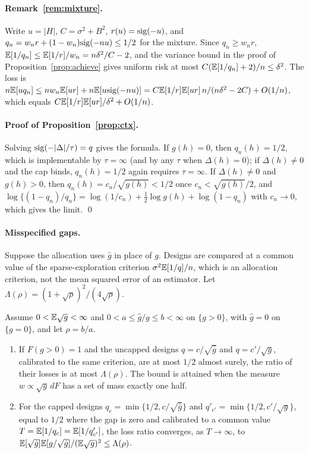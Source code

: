 \paragraph{Remark~\ref{rem:mixture}.} Write $u=|H|$, $C=\sigma^2+B^2$,
$r(u)=\mathrm{sig}(-u)$, and $q_n=w_nr+(1-w_n)\mathrm{sig}(-nu)\le1/2$ for the mixture. Since
$q_n\ge w_nr$, $\mathbb{E}[1/q_n]\le\mathbb{E}[1/r]/w_n=n\delta^2/C-2$, and the variance bound in
the proof of Proposition~\ref{prop:achieve} gives uniform risk at most
$C(\mathbb{E}[1/q_n]+2)/n\le\delta^2$. The loss is
$n\mathbb{E}[uq_n]\le nw_n\mathbb{E}[ur]+n\mathbb{E}[u\mathrm{sig}(-nu)]=C\mathbb{E}[1/r]\mathbb{E}[ur]\,n/(n\delta^2-2C)+O(1/n)$,
which equals $C\mathbb{E}[1/r]\mathbb{E}[ur]/\delta^2+O(1/n)$.

\paragraph{Proof of Proposition~\ref{prop:ctx}.} Solving
$\mathrm{sig}(-|\Delta|/\tau)=q$ gives the formula. If $g(h)=0$, then $q_n(h)=1/2$, which
is implementable by $\tau=\infty$ (and by any $\tau$ when $\Delta(h)=0$); if
$\Delta(h)\ne0$ and the cap binds, $q_n(h)=1/2$ again requires $\tau=\infty$. If
$\Delta(h)\neq0$ and $g(h)>0$, then $q_n(h)=c_n/\sqrt{g(h)}<1/2$ once
$c_n<\sqrt{g(h)}/2$, and
$\log\{(1-q_n)/q_n\}=\log(1/c_n)+\tfrac12\log g(h)+\log(1-q_n)$ with
$c_n\to0$, which gives the limit. \qed

\paragraph{Misspecified gaps.} Suppose the allocation uses $\hat g$ in place of $g$.
Designs are compared at a common value of the sparse-exploration criterion
$\sigma^2\mathbb{E}[1/q]/n$, which is an allocation criterion, not the mean squared error
of an estimator. Let $\Lambda(\rho)=(1+\sqrt\rho)^2/(4\sqrt\rho)$.

\begin{lemma}\label{lem:robust}
Assume $0<\mathbb{E}\sqrt g<\infty$ and $0<a\le\hat g/g\le b<\infty$ on $\{g>0\}$, with
$\hat g=0$ on $\{g=0\}$, and let $\rho=b/a$.
\begin{enumerate}[label=(\alph*),leftmargin=2em,itemsep=1pt]
\item If $F(g>0)=1$ and the uncapped designs $q=c/\sqrt{\hat g}$ and $q=c'/\sqrt g$,
calibrated to the same criterion, are at most $1/2$ almost surely, the ratio of
their losses is at most $\Lambda(\rho)$. The bound is attained when the measure
$w\propto\sqrt g\,dF$ has a set of mass exactly one half.
\item For the capped designs $q_c=\min\{1/2,c/\sqrt{\hat g}\}$ and
$q'_{c'}=\min\{1/2,c'/\sqrt g\}$, equal to $1/2$ where the gap is zero and
calibrated to a common value $T=\mathbb{E}[1/q_c]=\mathbb{E}[1/q'_{c'}]$, the loss ratio converges,
as $T\to\infty$, to $\mathbb{E}[\sqrt{\hat g}]\mathbb{E}[g/\sqrt{\hat g}]/(\mathbb{E}\sqrt g)^2\le\Lambda(\rho)$.
\end{enumerate}
\end{lemma}

